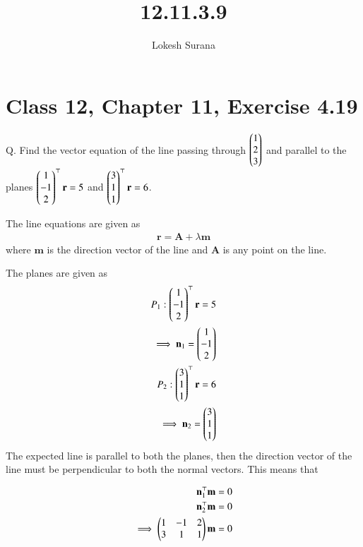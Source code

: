\documentclass[journal,12pt,twocolumn]{IEEEtran}
\renewcommand{\vec}[1]{\boldsymbol{\mathbf{#1}}}
\begin{document}
\vspace{3cm}
\title{12.11.3.9}
\author{Lokesh Surana}
\maketitle
\section*{Class 12, Chapter 11, Exercise 4.19}

Q. Find the vector equation of the line passing through $\begin{pmatrix}1\\2\\3\end{pmatrix}$ and parallel to the planes $\myvec{1\\-1\\2}^{\top}\vec{r} = 5$ and $\myvec{3\\1\\1}^{\top}\vec{r} = 6$.  

\solution
The line equations are given as
\begin{align}
    \label{eq:1} \vec{r} = \vec{A} + \lambda\vec{m}
\end{align}
where $\vec{m}$ is the direction vector of the line and $\vec{A}$ is any point on the line. 

The planes are given as
\begin{align}
    \label{eq:2} {P}_1: \myvec{1\\-1\\2}^{\top}\vec{r} = 5 \\
    \label{eq:3} \implies \vec{n}_1 = \myvec{1\\-1\\2}\\
    \label{eq:4} {P}_2: \myvec{3\\1\\1}^{\top}\vec{r} = 6 \\
    \label{eq:5} \implies \vec{n}_2 = \myvec{3\\1\\1}
\end{align}
The expected line is parallel to both the planes, then the direction vector of the line must be perpendicular to both the normal vectors. This means that

\begin{align}
    \label{eq:6} \vec{n}_1^{\top}\vec{m} = 0 \\
    \label{eq:7} \vec{n}_2^{\top}\vec{m} = 0 \\
    \label{eq:8} \implies \myvec{1&-1&2 \\ 3&1&1}\vec{m} = 0
\end{align}
\end{document}
